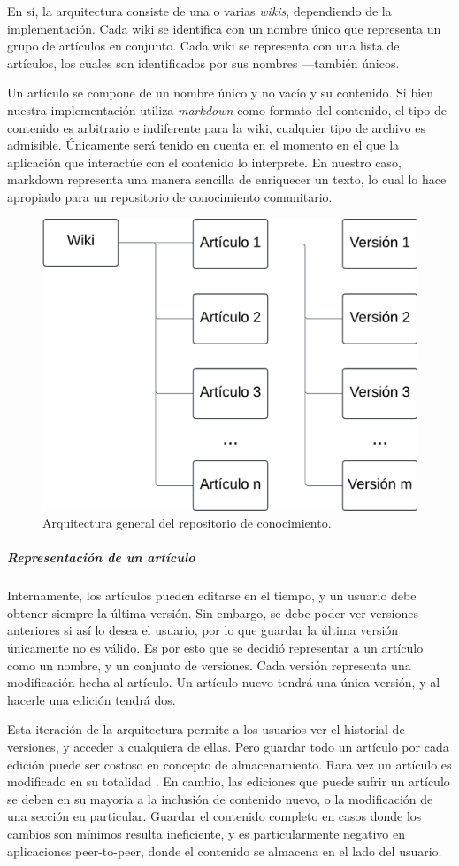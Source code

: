 En sí, la arquitectura consiste de una o varias \textit{wikis}, dependiendo de la implementación. Cada wiki se identifica con un nombre único que representa un grupo de artículos en conjunto. Cada wiki se representa con una lista de artículos, los cuales son identificados por sus nombres —también únicos. 

Un artículo se compone de un nombre único y no vacío y su contenido. Si bien nuestra implementación utiliza \textit{markdown} \cite{markdown} como formato del contenido, el tipo de contenido es arbitrario e indiferente para la wiki, cualquier tipo de archivo es admisible. Únicamente será tenido en cuenta en el momento en el que la aplicación que interactúe con el contenido lo interprete. En nuestro caso, markdown representa una manera sencilla de enriquecer un texto, lo cual lo hace apropiado para un repositorio de conocimiento comunitario.

\begin{figure}[H]
    \centering
    \includegraphics[width=0.5\linewidth]{img/solucion-wiki/arquitectura-wiki.png}
    \caption{Arquitectura general del repositorio de conocimiento.}
    \label{fig:usm-wiki}
\end{figure}

\subparagraph{Representación de un artículo}

Internamente, los artículos pueden editarse en el tiempo, y un usuario debe obtener siempre la última versión. Sin embargo, se debe poder ver versiones anteriores si así lo desea el usuario, por lo que guardar la última versión únicamente no es válido. Es por esto que se decidió representar a un artículo como un nombre, y un conjunto de versiones. Cada versión representa una modificación hecha al artículo. Un artículo nuevo tendrá una única versión, y al hacerle una edición tendrá dos.

Esta iteración de la arquitectura permite a los usuarios ver el historial de versiones, y acceder a cualquiera de ellas. Pero guardar todo un artículo por cada edición puede ser costoso en concepto de almacenamiento. Rara vez un artículo es modificado en su totalidad \cite{wiki-edits-stats}. En cambio, las ediciones que puede sufrir un artículo se deben en su mayoría a la inclusión de contenido nuevo, o la modificación de una sección en particular. Guardar el contenido completo en casos donde los cambios son mínimos resulta ineficiente, y es particularmente negativo en aplicaciones peer-to-peer, donde el contenido se almacena en el lado del usuario.

